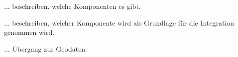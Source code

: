 ... beschreiben, welche Komponenten es gibt.

... beschreiben, welcher Komponente wird als Grundlage für die Integration genommen wird.

... Übergang zur Geodaten










